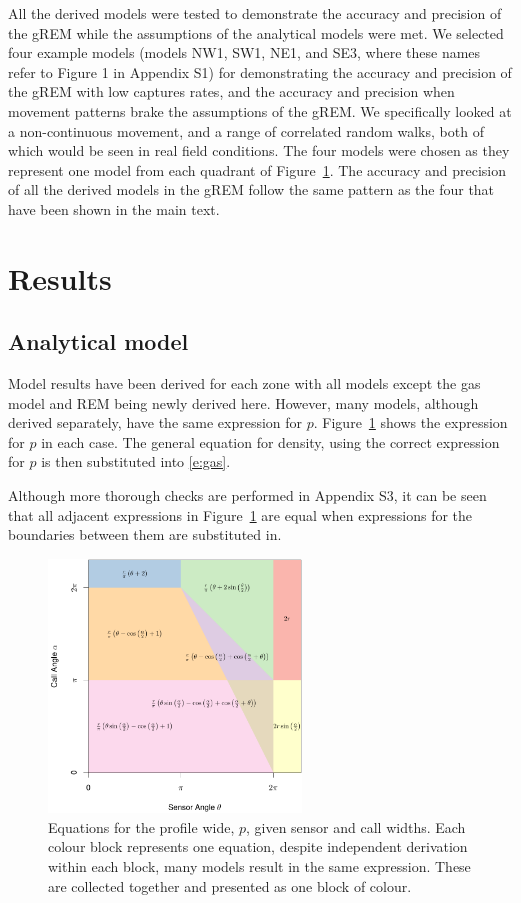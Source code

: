 \documentclass[a4paper,10pt,reqno,oneside]{amsart}
\begin{document}
All the derived models were tested to demonstrate the accuracy and precision of the gREM while the assumptions of the analytical models were met. We selected four example models (models NW1, SW1, NE1, and SE3, where these names refer to Figure 1 in Appendix S1) for demonstrating the accuracy and precision of the gREM with low captures rates, and the accuracy and precision when movement patterns brake the assumptions of the gREM.  We specifically looked at a non-continuous movement, and a range of correlated random walks, both of which would be seen in real field conditions. The four models were chosen as they represent one model from each quadrant of Figure~\ref{f:equalModelResults}. The accuracy and precision of all the derived models in the gREM follow the same pattern as the four that have been shown in the main text. 


\section{Results}

\subsection{Analytical model}

Model results have been derived for each zone with all models except the gas model and REM being newly derived here. However, many models, although derived separately, have the same expression for $p$. Figure~\ref{f:equalModelResults} shows the expression for $p$ in each case. The general equation for density, using the correct expression for $p$ is then substituted into \ref{e:gas}.

Although more thorough checks are performed in Appendix S3, it can be seen that all adjacent expressions in Figure~\ref{f:equalModelResults} are equal when expressions for the boundaries between them are substituted in.

\begin{figure}
\centering
\includegraphics[width=0.6\textwidth]{imgs/equalModelResults.pdf}
\caption{Equations for the profile wide, $p$, given sensor and call widths. Each colour block represents one equation, despite independent derivation within each block, many models result in the same expression. These are collected together and presented as one block of colour.}
\label{f:equalModelResults}
\end{figure}
\end{document}
